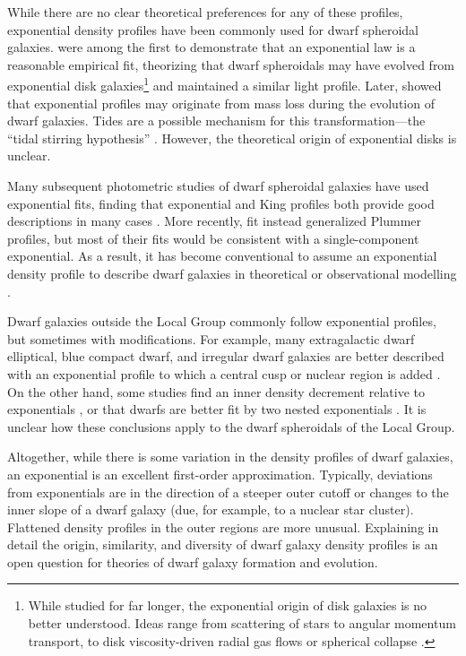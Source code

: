 While there are no clear theoretical preferences for any of these
profiles, exponential density profiles have been commonly used for dwarf
spheroidal galaxies. \citet{faber+lin1983} were among the first to
demonstrate that an exponential law is a reasonable empirical fit,
theorizing that dwarf spheroidals may have evolved from exponential disk
galaxies\footnote{While studied for far longer, the exponential origin
  of disk galaxies is no better understood. Ideas range from scattering
  of stars \citep{elmegreen+struck2013, wu+2022} to angular momentum
  transport, to disk viscosity-driven radial gas flows
  \citep{lin+pringle1987, wang+lilly2022} or spherical collapse
  \citep{freeman1970}.} and maintained a similar light profile. Later,
\citet{read+gilmore2005} showed that exponential profiles may originate
from mass loss during the evolution of dwarf galaxies. Tides are a
possible mechanism for this transformation---the ``tidal stirring
hypothesis'' \citep{mayer+2001a, klimentowski+2009}. However, the
theoretical origin of exponential disks is unclear.

Many subsequent photometric studies of dwarf spheroidal galaxies have
used exponential fits, finding that exponential and King profiles both
provide good descriptions in many cases
\citep{binggeli+sandage+tarenghi1984, mateo1998, mcconnachie+irwin2006, cicuendez+2018}.
More recently, \citet{moskowitz+walker2020} fit instead generalized
Plummer profiles, but most of their fits would be consistent with a
single-component exponential. As a result, it has become conventional to
assume an exponential density profile to describe dwarf galaxies in
theoretical or observational modelling
\citep[e.g.,][]{kowalczyk+2013, martin+2016, MV2020a, battaglia+2022}.

Dwarf galaxies outside the Local Group commonly follow exponential
profiles, but sometimes with modifications. For example, many
extragalactic dwarf elliptical, blue compact dwarf, and irregular dwarf
galaxies are better described with an exponential profile to which a
central cusp or nuclear region is added
\citep{caldwell+bothun1987, noeske+2003}. On the other hand, some
studies find an inner density decrement relative to exponentials
\citep[e.g.,][]{caldwell+1992, makarov+2012}, or that dwarfs are better
fit by two nested exponentials
\citep[e.g.,][]{aparicio+1997, graham+guzman2003, hunter+elmegreen2006, lee+2018}.
It is unclear how these conclusions apply to the dwarf spheroidals of
the Local Group.

Altogether, while there is some variation in the density profiles of
dwarf galaxies, an exponential is an excellent first-order
approximation. Typically, deviations from exponentials are in the
direction of a steeper outer cutoff or changes to the inner slope of a
dwarf galaxy (due, for example, to a nuclear star cluster). Flattened
density profiles in the outer regions are more unusual. Explaining in
detail the origin, similarity, and diversity of dwarf galaxy density
profiles is an open question for theories of dwarf galaxy formation and
evolution.

